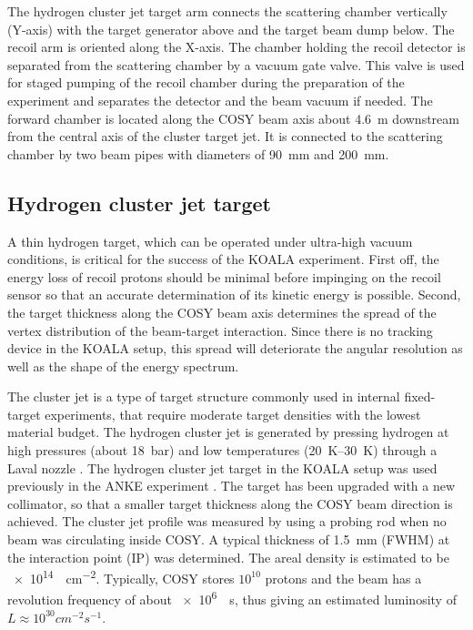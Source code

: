 \documentclass[number,5p]{elsarticle}
\begin{document}
The hydrogen cluster jet target arm connects the scattering chamber vertically (Y-axis) with the target generator above and the target beam dump below.
The recoil arm is oriented along the X-axis.
The chamber holding the recoil detector is separated from the scattering chamber by a vacuum gate valve.
This valve is used for staged pumping of the recoil chamber during the
preparation of the experiment and separates the detector and the beam vacuum if needed.
The forward chamber is located along the COSY beam axis about \SI{4.6}{\meter} downstream from the
central axis of the cluster target jet.
It is connected to the scattering chamber by two beam pipes with diameters of \SI{90}{\mm} and \SI{200}{\mm}.
\subsection{Hydrogen cluster jet target}
\label{sec:target}

A thin hydrogen target, which can be operated under ultra-high vacuum
conditions, is critical for the success of the KOALA experiment.
First off, the energy loss of recoil protons should be minimal before impinging
on the recoil sensor so that an accurate determination of its kinetic energy is possible.
Second, the target thickness along the COSY beam axis determines
the spread of the vertex distribution of the beam-target interaction.
Since there is no tracking device in the KOALA setup, this spread will deteriorate the
angular resolution as well as the shape of the energy spectrum.

The cluster jet is a type of target structure commonly used in internal fixed-target experiments, that require moderate
target densities with the lowest material budget.
The hydrogen cluster jet is generated by pressing hydrogen at high
pressures (about \SI{18}{\bar}) and low temperatures (\SIrange{20}{30}{\K})
through a Laval nozzle \cite{cluster_target}. 
The hydrogen cluster jet target in the KOALA setup was used previously in the ANKE experiment
\cite{cluster_target_new}.
The target has been upgraded with a new collimator, so that a smaller target
thickness along the COSY beam direction is achieved.
The cluster jet profile was measured by using a probing rod when no beam was circulating inside COSY.
A typical thickness of \SI{1.5}{\mm} (FWHM) at the interaction point (IP) was determined.
The areal density is estimated to be \SI{e14}{\atom\per\cm\squared}.
Typically, COSY stores $10^{10}$ protons and the beam has a revolution frequency
of about \SI[per-mode=power]{e6}{\per\second}, thus giving an estimated luminosity of $L \approx 10^{30}\si{cm^{-2}s^{-1}}$.
\end{document}
